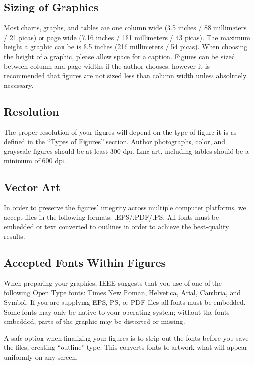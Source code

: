 \documentclass[journal]{IEEEtran}
\begin{document}
\subsection{Sizing of Graphics}

Most charts, graphs, and tables are one column wide (3.5 inches / 88 millimeters / 21 picas) or page wide (7.16 inches / 181 millimeters / 43 picas). The maximum height a graphic can be is 8.5 inches (216 millimeters / 54 picas). When choosing the height of a graphic, please allow space for a caption. Figures can be sized between column and page widths if the author chooses, however it is recommended that figures are not sized less than column width unless absolutely necessary. 

\subsection{Resolution}

The proper resolution of your figures will depend on the type of figure it is as defined in the ``Types of Figures'' section. Author photographs, color, and grayscale figures should be at least 300 dpi. Line art, including tables should be a minimum of 600 dpi.


\subsection{Vector Art}

In order to preserve the figures' integrity across multiple computer platforms, we accept files in the following formats: .EPS/.PDF/.PS. All fonts must be embedded or text converted to outlines in order to achieve the best-quality results.

\subsection{Accepted Fonts Within Figures}

When preparing your graphics, IEEE suggests that you use of one of the following Open Type fonts: Times New Roman, Helvetica, Arial, Cambria, and Symbol. If you are supplying EPS, PS, or PDF files all fonts must be embedded. Some fonts may only be native to your operating system; without the fonts embedded, parts of the graphic may be distorted or missing.

A safe option when finalizing your figures is to strip out the fonts before you save the files, creating ``outline'' type. This converts fonts to artwork what will appear uniformly on any screen.
\end{document}
